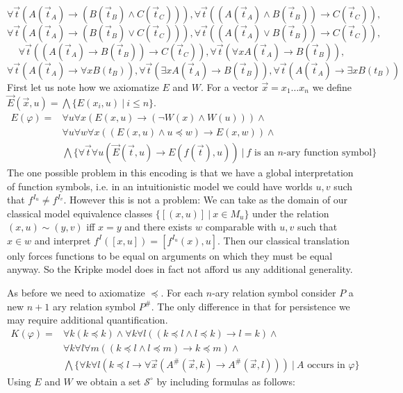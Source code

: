 \documentclass[a4paper,UKenglish,cleveref, autoref, thm-restate]{lipics-v2021}
\begin{document}
$$\forall \vec t(A(\vec t_{A})\to (B(\vec t_B)\wedge C(\vec t_C))), \forall \vec t((A(\vec t_{A})\wedge B(\vec t_B))\to C(\vec t_C)),$$$$ \forall \vec t(A(\vec t_{A})\to (B(\vec t_B)\vee C(\vec t_C))),
\forall \vec t((A(\vec t_{A})\vee B(\vec t_B))\to C(\vec t_C)),$$$$ \forall \vec t((A(\vec t_A)\to B(\vec t_B))\to C(\vec t_C)),\forall \vec t(\forall xA(\vec t_A)\to B(\vec t_B)),$$$$ \forall \vec t(A(\vec t_A)\to\forall xB(t_B)), \forall \vec t(\exists xA(\vec t_A)\to B(\vec t_B)), \forall \vec t(A(\vec t_A)\to\exists xB(t_B))$$	
First let us note how we axiomatize $E$ and $W$. For a vector $\vec x = x_1\dots x_n$ we define $\vec E(\vec x, u) = \bigwedge\{E(x_i, u)\:|\:i\leq n\}$.
\begin{align*}
	E(\varphi) = & \forall u\forall x(E(x, u)\to(\neg W(x)\wedge W(u)))\wedge\\
	& \forall u\forall w\forall x((E(x, u)\wedge u\preceq w)\to E(x, w))\wedge\\
	& \bigwedge\{\forall\vec t\forall u(\vec E(\vec t, u)\to E(f(\vec t), u))\:|\:\text{$f$ is an $n$-ary function symbol}\}
\end{align*}
The one possible problem in this encoding is that we have a global interpretation of function symbols, i.e. in an intuitionistic model we could have worlds $u, v$ such that $f^{I_u}\neq f^{I_v}$. However this is not a problem: We can take as the domain of our classical model equivalence classes $\{[(x, u)]\:|\: x\in M_u\}$ under the relation $(x, u)\sim (y, v)$ iff $x = y$ and there exists $w$ comparable with $u, v$ such that $x\in w$ and interpret $f^I([x, u]) = [f^{I_u}(x), u]$. Then our classical translation only forces functions to be equal on arguments on which they must be equal anyway. So the Kripke model does in fact not afford us any additional generality.

As before we need to axiomatize $\preceq$. For each $n$-ary relation symbol consider $P$ a new $n+1$ ary relation symbol $P^\#$.  The only difference in that for persistence we may require additional quantification.
\begin{align*}
	K(\varphi) = & \forall k(k\preceq k)\wedge \forall k\forall l((k\preceq l\wedge l\preceq k)\to l = k)\wedge\\
	& \forall k\forall l\forall m((k\preceq l\wedge l\preceq m)\to k\preceq m)\wedge\\
	& \bigwedge\{\forall k\forall l(k\preceq l\to \forall \vec x(A^\#(\vec x, k)\to A^\#(\vec x, l)))\:|\:\text{$A$ occurs in $\varphi$}\}
\end{align*}
Using $E$ and $W$ we obtain a set $\mathcal S^\circ$ by including formulas as follows:
\end{document}
